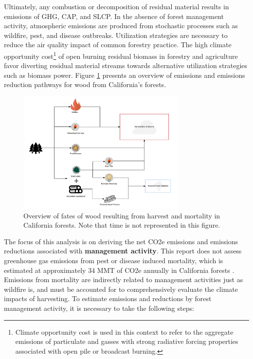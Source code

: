 \documentclass[a4paper]{article}
\begin{document}
Ultimately, any combustion or decomposition of residual material results in emissions of \ac{GHG}, \ac{CAP}, and \ac{SLCP}. In the absence of forest management activity, atmospheric emissions are produced from stochastic processes such as wildfire, pest, and disease outbreaks. Utilization strategies are necessary to reduce the air quality impact of common forestry practice. The high climate opportunity cost\footnote{Climate opportunity cost is used in this context to refer to the aggregate emissions of particulate and gasses with strong radiative forcing properties associated with open pile or broadcast burning.} of open burning residual biomass in forestry and agriculture favor diverting residual material streams towards alternative utilization strategies such as biomass power. Figure \ref{fig:wood_fates} presents an overview of emissions and emissions reduction pathways for wood from California's forests. 

\begin{figure}[htb]
\centering
\includegraphics[width=0.75\textwidth]{./graphics/wood_fates_rs.pdf}
\caption{Overview of fates of wood resulting from harvest and mortality in California forests. Note that time is not represented in this figure. \label{fig:wood_fates}}
\end{figure}


The focus of this analysis is on deriving the net \ac{CO2e} emissions and emissions reductions associated with \textbf{management activity}. This report does not assess greenhouse gas emissions from pest or disease induced mortality, which is estimated at approximately 34 MMT of \ac{CO2e} annually in California forests \cite{Christensen2016}. Emissions from mortality are indirectly related to management activities just as wildfire is, and must be accounted for to comprehensively evaluate the climate impacts of harvesting. To estimate emissions and reductions by forest  management activity, it is necessary to take the following steps:
\end{document}
